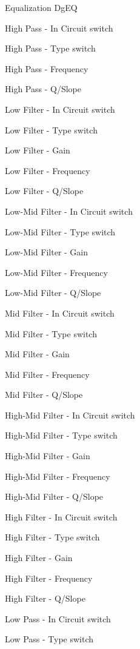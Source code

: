 \begin{DoxyItemize}
\item Equalization {\ttfamily \textquotesingle{}Dg\+E\+Q\textquotesingle{}}  
\begin{DoxyEnumerate}
\item High Pass -\/ In Circuit switch  
\item High Pass -\/ Type switch  
\item High Pass -\/ Frequency  
\item High Pass -\/ Q/\+Slope  
\item Low Filter -\/ In Circuit switch  
\item Low Filter -\/ Type switch  
\item Low Filter -\/ Gain  
\item Low Filter -\/ Frequency  
\item Low Filter -\/ Q/\+Slope  
\item Low-\/\+Mid Filter -\/ In Circuit switch  
\item Low-\/\+Mid Filter -\/ Type switch  
\item Low-\/\+Mid Filter -\/ Gain  
\item Low-\/\+Mid Filter -\/ Frequency  
\item Low-\/\+Mid Filter -\/ Q/\+Slope  
\item Mid Filter -\/ In Circuit switch  
\item Mid Filter -\/ Type switch  
\item Mid Filter -\/ Gain  
\item Mid Filter -\/ Frequency  
\item Mid Filter -\/ Q/\+Slope  
\item High-\/\+Mid Filter -\/ In Circuit switch  
\item High-\/\+Mid Filter -\/ Type switch  
\item High-\/\+Mid Filter -\/ Gain  
\item High-\/\+Mid Filter -\/ Frequency  
\item High-\/\+Mid Filter -\/ Q/\+Slope  
\item High Filter -\/ In Circuit switch  
\item High Filter -\/ Type switch  
\item High Filter -\/ Gain  
\item High Filter -\/ Frequency  
\item High Filter -\/ Q/\+Slope  
\item Low Pass -\/ In Circuit switch  
\item Low Pass -\/ Type switch  

\end{DoxyEnumerate}
\end{DoxyItemize}
